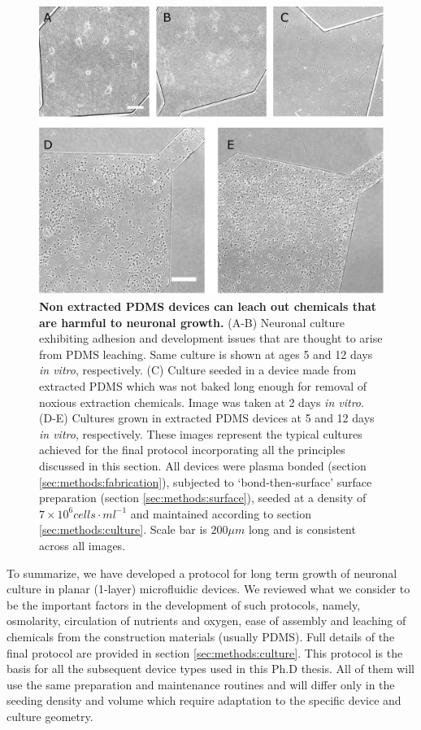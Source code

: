         \begin{figure}[!htb]
            \centering
            \includegraphics[width=15cm]{chapter4/figures/extraction/extractionIssue.jpg}
            \caption[Demonstration of PDMS related contaminations and the extraction procedure]{\textbf{Non extracted PDMS devices can leach out chemicals that are harmful to neuronal growth.} (A-B) Neuronal culture exhibiting adhesion and development issues that are thought to arise from PDMS leaching. Same culture is shown at ages 5 and 12 days \textit{in vitro}, respectively. (C) Culture seeded in a device made from extracted PDMS which was not baked long enough for removal of noxious extraction chemicals. Image was taken at 2 days \textit{in vitro}. (D-E) Cultures grown in extracted PDMS devices at 5 and 12 days \textit{in vitro}, respectively. These images represent the typical cultures achieved for the final protocol incorporating all the principles discussed in this section. All devices were plasma bonded (section \ref{sec:methods:fabrication}), subjected to `bond-then-surface' surface preparation (section \ref{sec:methods:surface}), seeded at a density of \(7\times10^6 cells\cdot ml^{-1}\) and maintained according to section \ref{sec:methods:culture}. Scale bar is \(200 \mu m\) long and is consistent across all images.}
            \label{fig:devices:extraction}
        \end{figure}

        To summarize, we have developed a protocol for long term growth of neuronal culture in planar (1-layer) microfluidic devices. We reviewed what we consider to be the important factors in the development of such protocols, namely, osmolarity, circulation of nutrients and oxygen, ease of assembly and leaching of chemicals from the construction materials (usually PDMS). Full details of the final protocol are provided in section \ref{sec:methods:culture}. This protocol is the basis for all the subsequent device types used in this Ph.D thesis. All of them will use the same preparation and maintenance routines and will differ only in the seeding density and volume which require adaptation to the specific device and culture geometry.

